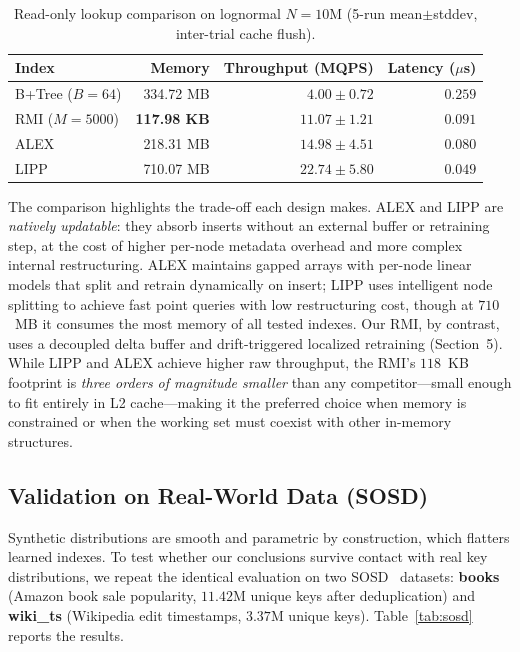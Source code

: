 \documentclass[10pt,twocolumn,a4paper]{article}
\begin{document}
\begin{table}[t]
\centering
\caption{Read-only lookup comparison on lognormal $N{=}10$M (5-run mean$\pm$stddev, inter-trial cache flush).}
\label{tab:baselines}
\begin{tabular}{lrrr}
\toprule
\textbf{Index} & \textbf{Memory} & \textbf{Throughput (MQPS)} & \textbf{Latency ($\mu$s)} \\
\midrule
B+Tree ($B{=}64$) & 334.72 MB & $4.00 \pm 0.72$ & $0.259$ \\
RMI ($M{=}5000$)   & \textbf{117.98 KB} & $11.07 \pm 1.21$ & $0.091$ \\
ALEX~\cite{ding2020alex}   & 218.31 MB & $14.98 \pm 4.51$ & $0.080$ \\
LIPP~\cite{wu2021lipp}     & 710.07 MB & $\mathbf{22.74 \pm 5.80}$ & $\mathbf{0.049}$ \\
\bottomrule
\end{tabular}
\end{table}

\medskip

The comparison highlights the trade-off each design makes. ALEX and LIPP are \textit{natively updatable}: they absorb inserts without an external buffer or retraining step, at the cost of higher per-node metadata overhead and more complex internal restructuring. ALEX maintains gapped arrays with per-node linear models that split and retrain dynamically on insert; LIPP uses intelligent node splitting to achieve fast point queries with low restructuring cost, though at $710$~MB it consumes the most memory of all tested indexes. Our RMI, by contrast, uses a decoupled delta buffer and drift-triggered localized retraining (Section~5). While LIPP and ALEX achieve higher raw throughput, the RMI's $118$~KB footprint is \textit{three orders of magnitude smaller} than any competitor---small enough to fit entirely in L2 cache---making it the preferred choice when memory is constrained or when the working set must coexist with other in-memory structures.

\subsection{Validation on Real-World Data (SOSD)}
Synthetic distributions are smooth and parametric by construction, which flatters learned indexes. To test whether our conclusions survive contact with real key distributions, we repeat the identical evaluation on two SOSD~\cite{marcus2020benchmarking} datasets: \textbf{books} (Amazon book sale popularity, $11.42$M unique keys after deduplication) and \textbf{wiki\_ts} (Wikipedia edit timestamps, $3.37$M unique keys). Table~\ref{tab:sosd} reports the results.
\end{document}
